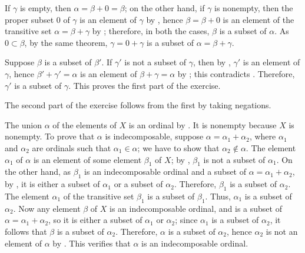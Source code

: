 \documentclass{article}
\begin{document}
\begin{solution}[\ref{exe:v5ldoxkc}]
  \label{sol:2pzkfvo2}
  If \(\gamma\) is empty, then \(\alpha = \beta + 0 = \beta\); on the
  other hand, if \(\gamma\) is nonempty, then the proper subset \(0\)
  of \(\gamma\) is an element of \(\gamma\) by ,
  hence \(\beta = \beta + 0\) is an element of the transitive set
  \(\alpha = \beta + \gamma\) by ; therefore, in
  both the cases, \(\beta\) is a subset of \(\alpha\).  As
  \(0 \subset \beta\), by the same theorem, \(\gamma = 0 + \gamma\) is
  a subset of \(\alpha = \beta + \gamma\).
\end{solution}

\begin{solution}[\ref{exe:vwz0bksh}]
  \label{sol:27wcstr7}
  Suppose \(\beta\) is a subset of \(\beta'\).  If \(\gamma'\) is not
  a subset of \(\gamma\), then by ,
  \(\gamma'\) is an element of \(\gamma\), hence
  \(\beta' + \gamma' = \alpha\) is an element of
  \(\beta + \gamma = \alpha\) by ; this contradicts
  .  Therefore, \(\gamma'\) is a subset of
  \(\gamma\).  This proves the first part of the exercise.

  The second part of the exercise follows from the first by taking
  negations.
\end{solution}

\begin{solution}[\ref{exe:6bo4uirh}]
  \label{sol:30t76fdi}
  The union \(\alpha\) of the elements of \(X\) is an ordinal by
  .  It is nonempty because \(X\) is nonempty.  To
  prove that \(\alpha\) is indecomposable, suppose
  \(\alpha = \alpha_1 + \alpha_2\), where \(\alpha_1\) and
  \(\alpha_2\) are ordinals such that \(\alpha_1 \in \alpha\); we have
  to show that \(\alpha_2 \notin \alpha\).  The element \(\alpha_1\)
  of \(\alpha\) is an element of some element \(\beta_1\) of \(X\); by
  , \(\beta_1\) is not a subset of
  \(\alpha_1\).  On the other hand, as \(\beta_1\) is an
  indecomposable ordinal and a subset of
  \(\alpha = \alpha_1 + \alpha_2\), by , it is
  either a subset of \(\alpha_1\) or a subset of \(\alpha_2\).
  Therefore, \(\beta_1\) is a subset of \(\alpha_2\).  The element
  \(\alpha_1\) of the transitive set \(\beta_1\) is a subset of
  \(\beta_1\).  Thus, \(\alpha_1\) is a subset of \(\alpha_2\).  Now
  any element \(\beta\) of \(X\) is an indecomposable ordinal, and is
  a subset of \(\alpha = \alpha_1 + \alpha_2\), so it is either a
  subset of \(\alpha_1\) or \(\alpha_2\); since \(\alpha_1\) is a
  subset of \(\alpha_2\), it follows that \(\beta\) is a subset of
  \(\alpha_2\).  Therefore, \(\alpha\) is a subset of \(\alpha_2\),
  hence \(\alpha_2\) is not an element of \(\alpha\) by
  .  This verifies that \(\alpha\) is
  an indecomposable ordinal.
\end{solution}
\end{document}
